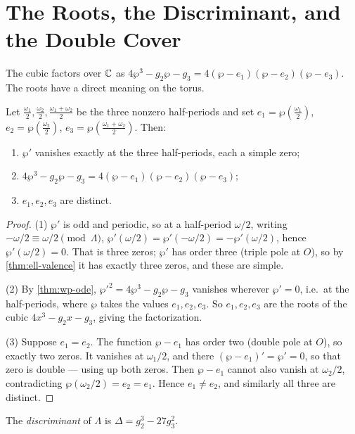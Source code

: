\section{The Roots, the Discriminant, and the Double Cover}
\label{sec:wp-roots}

The cubic factors over \(\mathbb{C}\) as \(4\wp^3 - g_2\wp - g_3 = 4(\wp - e_1)(\wp - e_2)
(\wp - e_3)\). The roots have a direct meaning on the torus.

\begin{proposition}
\label{prop:wp-roots}
Let \(\tfrac{\omega_1}{2}, \tfrac{\omega_2}{2}, \tfrac{\omega_1+\omega_2}{2}\) be
the three nonzero half-periods and set
\(e_1 = \wp(\tfrac{\omega_1}{2})\), \(e_2 = \wp(\tfrac{\omega_2}{2})\),
\(e_3 = \wp(\tfrac{\omega_1+\omega_2}{2})\). Then:
\begin{enumerate}
\item \(\wp'\) vanishes exactly at the three half-periods, each a simple zero;
\item \(4\wp^3 - g_2\wp - g_3 = 4(\wp-e_1)(\wp-e_2)(\wp-e_3)\);
\item \(e_1, e_2, e_3\) are distinct.
\end{enumerate}
\end{proposition}

\begin{proof}
(1) \(\wp'\) is odd and periodic, so at a half-period \(\omega/2\), writing
\(-\omega/2 \equiv \omega/2 \pmod\Lambda\), \(\wp'(\omega/2) = \wp'(-\omega/2) =
-\wp'(\omega/2)\), hence \(\wp'(\omega/2) = 0\). That is three zeros; \(\wp'\) has
order three (triple pole at \(O\)), so by \cref{thm:ell-valence} it has exactly
three zeros, and these are simple.

(2) By \cref{thm:wp-ode}, \(\wp'^2 = 4\wp^3 - g_2\wp - g_3\) vanishes wherever
\(\wp' = 0\), i.e.\ at the half-periods, where \(\wp\) takes the values
\(e_1, e_2, e_3\). So \(e_1, e_2, e_3\) are the roots of the cubic
\(4x^3 - g_2 x - g_3\), giving the factorization.

(3) Suppose \(e_1 = e_2\). The function \(\wp - e_1\) has order two (double pole
at \(O\)), so exactly two zeros. It vanishes at \(\omega_1/2\), and there
\((\wp - e_1)' = \wp' = 0\), so that zero is double --- using up both zeros. Then
\(\wp - e_1\) cannot also vanish at \(\omega_2/2\), contradicting
\(\wp(\omega_2/2) = e_2 = e_1\). Hence \(e_1 \ne e_2\), and similarly all three
are distinct.
\end{proof}

\begin{definition}
\label{def:wp-discriminant}
The \emph{discriminant} of \(\Lambda\) is \(\Delta = g_2^3 - 27 g_3^2\).
\end{definition}

